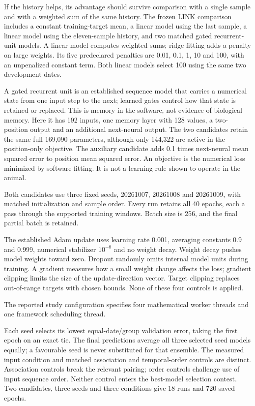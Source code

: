 If the history helps, its advantage should survive comparison with a single sample and with a weighted sum of the same history. The frozen LINK comparison includes a constant training-target mean, a linear
model using the last sample, a linear model using the eleven-sample history,
and two matched gated recurrent-unit models. A linear model computes weighted
sums; ridge fitting adds a penalty on large weights. Its five predeclared
penalties are 0.01, 0.1, 1, 10 and 100, with an unpenalized constant term. Both
linear models select 100 using the same two development dates.

A gated recurrent unit is an established sequence model that carries a numerical state from one input step to the next; learned gates control how that state is retained or replaced. This is memory in the software, not evidence of biological memory. Here it has 192 inputs, one memory layer with 128
values, a two-position output and an additional next-neural output. The two
candidates retain the same full 169,090 parameters, although only 144,322 are
active in the position-only objective. The auxiliary candidate adds 0.1 times
next-neural mean squared error to position mean squared error. An objective is
the numerical loss minimized by software fitting. It is not a learning rule
shown to operate in the animal.

Both candidates use three fixed seeds, 20261007, 20261008 and 20261009, with matched initialization and sample order. Every run retains all 40 epochs, each a pass through the supported training windows. Batch size is 256, and the final partial batch is retained.

The established Adam update uses learning rate 0.001, averaging constants 0.9 and 0.999, numerical stabilizer $10^{-8}$ and no weight decay. Weight decay pushes model weights toward zero. Dropout randomly omits internal model units during training. A gradient measures how a small weight change affects the loss; gradient clipping limits the size of the update-direction vector. Target clipping replaces out-of-range targets with chosen bounds. None of these four controls is applied.

The reported study configuration specifies four mathematical worker threads and one framework scheduling thread.

Each seed selects its lowest equal-date/group validation error, taking the
first epoch on an exact tie. The final predictions average all three selected
seed models equally; a favourable seed is never substituted for that ensemble.
The measured input condition and matched association and temporal-order
controls are distinct. Association controls break the relevant pairing;
order controls challenge use of input sequence order. Neither control enters
the best-model selection contest. Two candidates, three seeds and three
conditions give 18 runs and 720 saved epochs.

